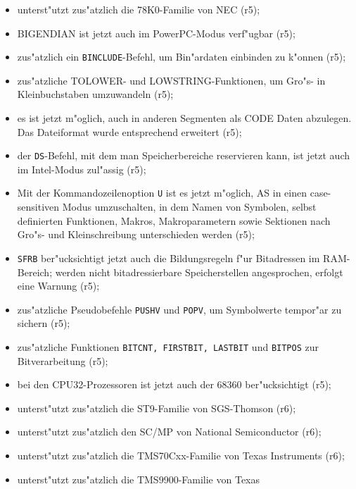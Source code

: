 \documentclass[12pt,a4paper,twoside]{report}
\newcommand{\tty}[1]{{\tt #1}}
\newcommand{\asname}{AS}
\begin{document}
\begin{itemize}
{\begin{itemize}
{            \tty{NOSKIPPED} und \tty{PURECODE}, um nicht assemblierten
            Code aus dem Listing auszublenden (r5);}
      \item{unterst"utzt zus"atzlich die 78K0-Familie von NEC (r5);}
      \item{BIGENDIAN ist jetzt auch im PowerPC-Modus verf"ugbar (r5);}
      \item{zus"atzlich ein \tty{BINCLUDE}-Befehl, um Bin"ardaten
            einbinden zu k"onnen (r5);}
      \item{zus"atzliche TOLOWER- und LOWSTRING-Funktionen, um
                 Gro"s- in Kleinbuchstaben umzuwandeln (r5);}
      \item{es ist jetzt m"oglich, auch in anderen Segmenten als
            CODE Daten abzulegen.  Das Dateiformat wurde entsprechend
            erweitert (r5);}
      \item{der \tty{DS}-Befehl, mit dem man Speicherbereiche reservieren
            kann, ist jetzt auch im Intel-Modus zul"assig (r5);}
      \item{Mit der Kommandozeilenoption \tty{U} ist es jetzt
            m"oglich, \asname{} in einen case-sensitiven Modus umzuschalten,
            in dem Namen von Symbolen, selbst definierten Funktionen,
            Makros, Makroparametern sowie Sektionen nach Gro"s-
            und Kleinschreibung unterschieden werden (r5);}
      \item{\tty{SFRB} ber"ucksichtigt jetzt auch die Bildungsregeln
            f"ur Bitadressen im RAM-Bereich; werden nicht bitadressierbare
            Speicherstellen angesprochen, erfolgt eine Warnung (r5);}
      \item{zus"atzliche Pseudobefehle \tty{PUSHV} und \tty{POPV}, um
            Symbolwerte tempor"ar zu sichern (r5);}
      \item{zus"atzliche Funktionen \tty{BITCNT, FIRSTBIT, LASTBIT} und
                 \tty{BITPOS} zur Bitverarbeitung (r5);}
      \item{bei den CPU32-Prozessoren ist jetzt auch der 68360
            ber"ucksichtigt (r5);}
      \item{unterst"utzt zus"atzlich die ST9-Familie von SGS-Thomson (r6);}
      \item{unterst"utzt zus"atzlich den SC/MP von National Semiconductor
            (r6);}
      \item{unterst"utzt zus"atzlich die TMS70Cxx-Familie von Texas
            Instruments (r6);}
      \item{unterst"utzt zus"atzlich die TMS9900-Familie von Texas
}
\end{itemize}}
\end{itemize}
\end{document}
